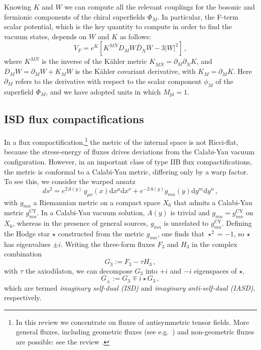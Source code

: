 \documentclass[12pt,a4wide]{article}
\def\d{\mathrm{d}}
\begin{document}
Knowing $K$ and $W$ we can compute all the relevant couplings for the bosonic and fermionic components of the chiral superfields $\Phi_M$.
In particular, the F-term scalar potential, which is the key quantity to compute in order to find the vacuum states, depends on $W$ and $K$ as follows:
\begin{equation}\label{eq:vkw}
    V_F=e^K\left[K^{M\bar N}D_M W \bar{D}_{\bar N}\overline{W}-3|W|^2\right]\,,
\end{equation}
where $K^{M \bar N}$ is the inverse of the K\"ahler metric $K_{M\bar N}=\partial_M\partial_{\bar N}K$, and $D_M W=\partial_M W+K_M W$ is the K\"ahler covariant derivative, with $K_M=\partial_M K$. Here $\partial_M$ refers to the derivative with respect to the scalar component $\phi_M$ of the superfield $\Phi_M$, and we have adopted units in which $M_{\text{pl}}=1$.

\subsection{ISD flux compactifications}\label{ss:isd}

In a flux compactification,\footnote{In this review we concentrate on fluxes of antisymmetric tensor fields. More general fluxes, including 
geometric fluxes (see e.g.~\cite{Kachru:2002sk}) and 
non-geometric fluxes \cite{Wecht:2007wu,Andriot:2012wx}
are possible: see the review
\cite{Plauschinn:2018wbo}.}
the metric of the internal space is not Ricci-flat, because the stress-energy of fluxes drives deviations from the Calabi-Yau vacuum configuration.  However, in an important class of type IIB flux compactifications, the metric is conformal to a Calabi-Yau metric, differing only by a warp factor.  To see this, we consider the warped ansatz 
\begin{equation}\label{eq:warpedproductansatz}
 ds^2 = e^{2A(y)}\,g_{\mu\nu}(x)\d x^{\mu}\d x^{\nu}+e^{-2A(y)}g_{mn}(y)\d y^m \d y^n\,,   
\end{equation} with $g_{mn}$ a Riemannian metric on a compact space $X_6$ that admits a Calabi-Yau metric $g_{mn}^{\text{CY}}$.
In a Calabi-Yau vacuum solution, $A(y)$ is trivial and $g_{mn}=g_{mn}^{\text{CY}}$ on $X_6$, whereas in the presence of general sources, $g_{mn}$ is unrelated to $g_{mn}^{\text{CY}}$.  Defining the  Hodge star $\star$ constructed from the metric $g_{mn}$, one finds that $\star^2=-1$, so $\star$ has eigenvalues $\pm i$.  Writing the three-form fluxes $F_3$ and $H_3$ in the complex combination
\begin{equation}
 G_3 := F_3 - \tau H_3\,,   
\end{equation}
with $\tau$ the axiodilaton, we can decompose $G_3$ into $+i$ and $-i$ eigenspaces of $\star$,
\begin{equation}
 G_\pm := G_3 \mp i \star G_3\,,   
\end{equation}
which are termed \emph{imaginary self-dual (ISD)} and \emph{imaginary anti-self-dual (IASD)}, respectively.
\end{document}
